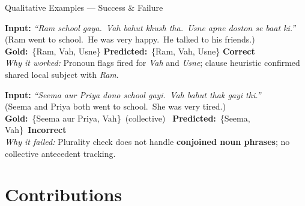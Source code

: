 \documentclass[aspectratio=169]{beamer}
\begin{document}
\begin{frame}{Qualitative Examples — Success \& Failure}
  \begin{tcolorbox}[rbox={Successful Resolution \checkmark}]
    \small
    \textbf{Input:}
    \textit{``Ram school gaya.\ Vah bahut khush tha.\ Usne apne doston se baat ki.''}\\
    \hspace{1.5em}(Ram went to school.\ He was very happy.\ He talked to his friends.)\\[4pt]
    \textbf{Gold:}\ \{Ram, Vah, Usne\}\quad
    \textbf{Predicted:}\ \{Ram, Vah, Usne\}\quad
    \textcolor{accentgreen}{\textbf{Correct}}\\[3pt]
    \textit{Why it worked:} Pronoun flags fired for \textit{Vah} and \textit{Usne};
    clause heuristic confirmed shared local subject with \textit{Ram}.
  \end{tcolorbox}

  \vspace{8pt}

  \begin{tcolorbox}[wbox={Failure Case $\boldsymbol{\times}$}]
    \small
    \textbf{Input:}
    \textit{``Seema aur Priya dono school gayi.\ Vah bahut thak gayi thi.''}\\
    \hspace{1.5em}(Seema and Priya both went to school.\ She was very tired.)\\[4pt]
    \textbf{Gold:}\ \{Seema aur Priya, Vah\}\ (collective)\ \quad
    \textbf{Predicted:}\ \{Seema, Vah\}\
    \textcolor{red!70!black}{\textbf{Incorrect}}\\[3pt]
    \textit{Why it failed:} Plurality check does not handle
    \textbf{conjoined noun phrases}; no collective antecedent tracking.
  \end{tcolorbox}
\end{frame}


\section{Contributions}
\end{document}
